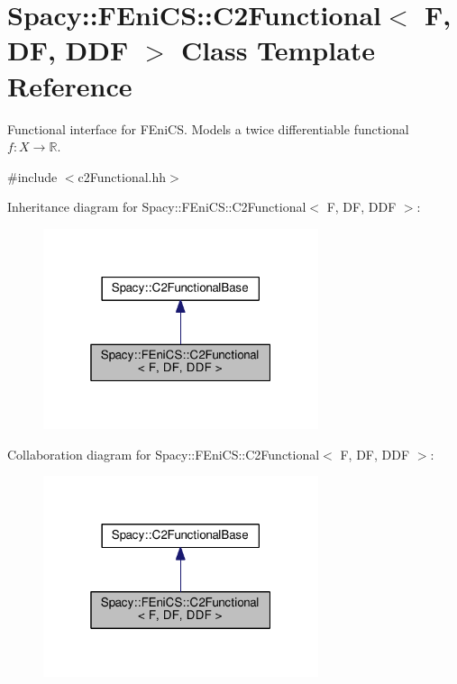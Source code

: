 \hypertarget{classSpacy_1_1FEniCS_1_1C2Functional}{}\section{Spacy\+:\+:F\+Eni\+C\+S\+:\+:C2\+Functional$<$ F, D\+F, D\+D\+F $>$ Class Template Reference}
\label{classSpacy_1_1FEniCS_1_1C2Functional}


Functional interface for F\+Eni\+C\+S. Models a twice differentiable functional $f:X\rightarrow \mathbb{R}$.  




{\ttfamily \#include $<$c2\+Functional.\+hh$>$}



Inheritance diagram for Spacy\+:\+:F\+Eni\+C\+S\+:\+:C2\+Functional$<$ F, D\+F, D\+D\+F $>$\+:\nopagebreak
\begin{figure}[H]
\begin{center}
\leavevmode
\includegraphics[width=229pt]{classSpacy_1_1FEniCS_1_1C2Functional__inherit__graph}
\end{center}
\end{figure}


Collaboration diagram for Spacy\+:\+:F\+Eni\+C\+S\+:\+:C2\+Functional$<$ F, D\+F, D\+D\+F $>$\+:\nopagebreak
\begin{figure}[H]
\begin{center}
\leavevmode
\includegraphics[width=229pt]{classSpacy_1_1FEniCS_1_1C2Functional__coll__graph}
\end{center}
\end{figure}
